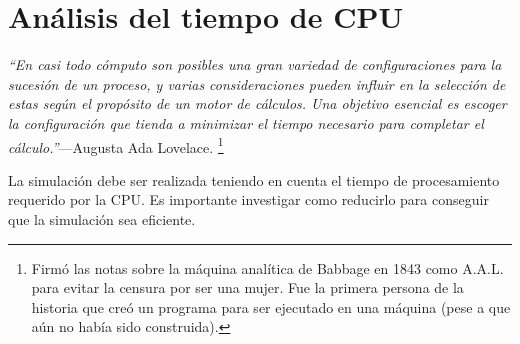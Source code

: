 %

\section{Análisis del tiempo de CPU}
\textsl{``En casi todo cómputo son posibles una gran variedad de configuraciones 
para la sucesión de un proceso, y varias consideraciones pueden influir en la 
selección de estas según el propósito de un motor de cálculos. Una objetivo 
esencial es escoger la configuración que tienda a minimizar el tiempo necesario 
para completar el cálculo.''}---Augusta Ada Lovelace.
\footnote{Firmó las notas sobre la máquina analítica de Babbage en 1843 como 
A.A.L. para evitar la censura por ser una mujer. Fue la primera persona de la 
historia que creó un programa para ser ejecutado en una máquina (pese a que aún 
no había sido construida).}
\newline

La simulación debe ser realizada teniendo en cuenta el tiempo de procesamiento 
requerido por la CPU. Es importante investigar como reducirlo para conseguir que 
la simulación sea eficiente.

